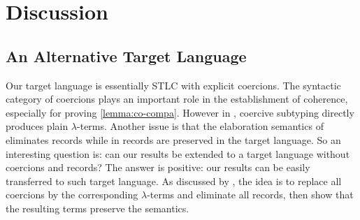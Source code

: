 
\section{Discussion}
\label{sec:diss}

\subsection{An Alternative Target Language}

Our target language is essentially STLC with explicit coercions. The syntactic
category of coercions plays an important role in the establishment of coherence,
especially for proving \cref{lemma:co-compa}. However in \oname, coercive
subtyping directly produces plain $\lambda$-terms. Another issue is that the
elaboration semantics of \fname eliminates records while in \name records are
preserved in the target language. So an interesting question is: can our results
be extended to a target language without coercions and records? The answer is
positive: our results can be easily transferred to such target language. As
discussed by \citet{biernacki2015logical}, the idea is to replace all coercions
by the corresponding $\lambda$-terms and eliminate all records, then show that
the resulting terms preserve the semantics.






